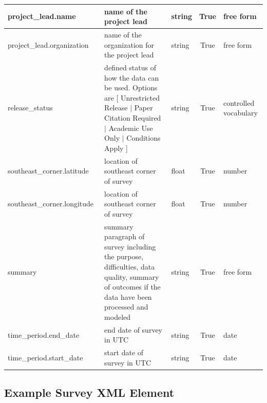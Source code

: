 \documentclass{article}
\begin{document}
\begin{table}[h!]
\begin{tabular}{|l|p{2.75in}|l|c|p{.95in}|}
		project\_lead.name & name of the project lead & string & True & free form  \\ \hline
		project\_lead.organization & name of the organization for the project lead & string & True & free form  \\ \hline
		release\_status\ & defined status of how the data can be used. Options are [ Unrestricted Release $|$ Paper Citation Required $|$ Academic Use Only $|$ Conditions Apply ] & string & True & controlled vocabulary \\ \hline
		southeast\_corner.latitude\ & location of southeast corner of survey & float & True & number \\ \hline
		southeast\_corner.longitude\ & location of southeast corner of survey & float & True & number \\ \hline
		summary\ & summary paragraph of survey including the purpose, difficulties, data quality, summary of outcomes if the data have been processed and modeled & string & True & free form \\ \hline
		time\_period.end\_date\ & end date of survey in UTC & string & True & date  \\ \hline
		time\_period.start\_date\ & start date of survey in UTC & string & True & date \\ \hline
	
	\end{tabular}
	\label{tab:survey}
\end{table} 

\newpage
\subsection{Example Survey XML Element}
\end{document}
